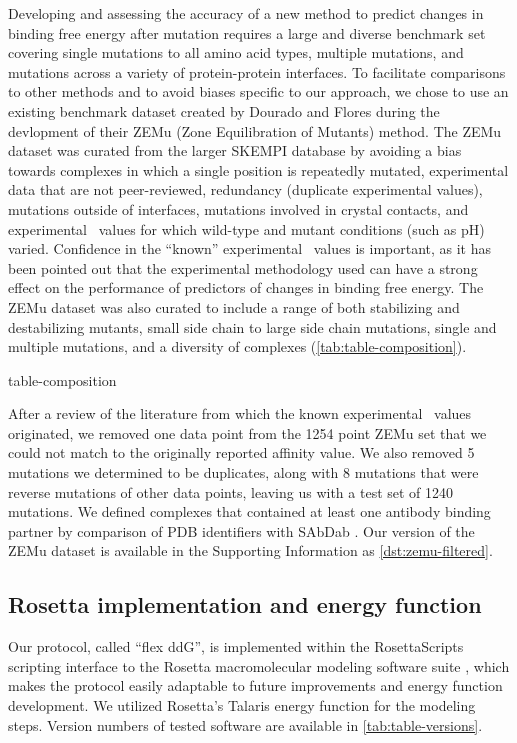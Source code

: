 Developing and assessing the accuracy of a new method to predict changes in binding free energy after mutation requires a large and diverse benchmark set covering single mutations to all amino acid types, multiple mutations, and mutations across a variety of protein-protein interfaces.
To facilitate comparisons to other methods and to avoid biases specific to our approach, we chose to use an existing benchmark dataset created by Dourado and Flores\cite{dourado_multiscale_2014} during the devlopment of their ZEMu (Zone Equilibration of Mutants) method.
The ZEMu dataset was curated from the larger SKEMPI database\cite{moal_skempi:_2012} by avoiding a bias towards complexes in which a single position is repeatedly mutated, experimental data that are not peer-reviewed, redundancy (duplicate experimental values), mutations outside of interfaces, mutations involved in crystal contacts, and experimental \ddg\ values for which wild-type and mutant conditions (such as pH) varied.
Confidence in the ``known'' experimental \ddg\ values is important, as it has been pointed out that the experimental methodology used can have a strong effect on the performance of predictors of changes in binding free energy\cite{geng_exploring_2016}.
The ZEMu dataset was also curated to include a range of both stabilizing and destabilizing mutants, small side chain to large side chain mutations, single and multiple mutations, and a diversity of complexes (\cref{tab:table-composition}).

{table-composition}

After a review of the literature from which the known experimental \ddg\ values originated, we removed one data point from the 1254 point ZEMu set that we could not match to the originally reported affinity value. We also removed 5 mutations we determined to be duplicates, along with 8 mutations that were reverse mutations of other data points, leaving us with a test set of 1240 mutations.
We defined complexes that contained at least one antibody binding partner by comparison of PDB identifiers with SAbDab \cite{dunbar_sabdab:_2014}.
Our version of the ZEMu dataset is available in the Supporting Information as \cref{dst:zemu-filtered}.

\subsection{Rosetta implementation and energy function}

Our protocol, called ``flex ddG'', is implemented within the RosettaScripts scripting interface to the Rosetta macromolecular modeling software suite \cite{fleishman_rosettascripts:_2011}, which makes the protocol easily adaptable to future improvements and energy function development. We utilized Rosetta's Talaris \cite{leaver-fay_chapter_2013,song_structure-guided_2011,shapovalov_smoothed_2011,omeara_combined_2015} energy function for the modeling steps.
Version numbers of tested software are available in \cref{tab:table-versions}.

